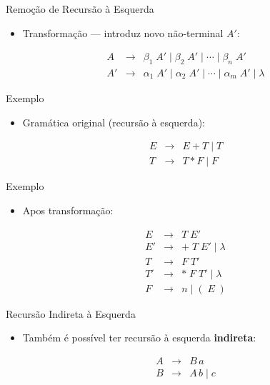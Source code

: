 \begin{frame}{Remoção de Recursão à Esquerda}

    \begin{itemize}

        \item
        Transformação --- introduz novo não-terminal \(A'\):
    \end{itemize}

    \[\begin{array}{lcl}
    A  &\to& \beta_1\;A' \mid \beta_2\;A' \mid \cdots \mid \beta_n\;A' \\
    A' &\to& \alpha_1\;A' \mid \alpha_2\;A' \mid \cdots \mid \alpha_m\;A' \mid \lambda
\end{array}\]
\end{frame}

\begin{frame}{Exemplo}

    \begin{itemize}

        \item
        Gramática original (recursão à esquerda):
    \end{itemize}

    \[\begin{array}{lcl}
    E &\to& E + T \mid T \\
    T &\to& T * F \mid F
\end{array}\]
\end{frame}

\begin{frame}{Exemplo}

    \begin{itemize}

        \item
        Apos transformação:
    \end{itemize}

    \[\begin{array}{lcl}
    E  &\to& T\;E' \\
    E' &\to& +\;T\;E' \mid \lambda \\
    T  &\to& F\;T' \\
    T' &\to& *\;F\;T' \mid \lambda \\
    F  &\to& n \mid (\;E\;)
\end{array}\]
\end{frame}

\begin{frame}{Recursão Indireta à Esquerda}

    \begin{itemize}

        \item
        Também é possível ter recursão à esquerda \textbf{indireta}:
    \end{itemize}

    \[\begin{array}{lcl}
    A &\to& B\,a \\
    B &\to& A\,b \mid c
\end{array}\]
\end{frame}

